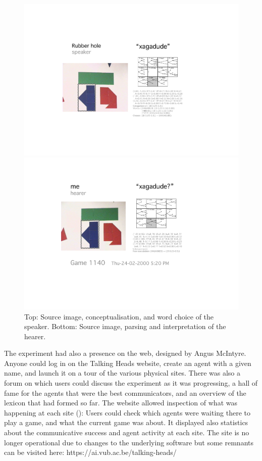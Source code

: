 \begin{figure}[htbp]
 \centerline{\includegraphics[width=.80\textwidth]{chap8/figures/xagadu-speaker}}
\centerline{\includegraphics[width=.80\textwidth]{chap8/figures/xagadu-hearer}}
\caption{\label{fig:interaction} 
Top: Source image, conceptualisation, and word choice of the speaker. Bottom: Source image, parsing and interpretation 
of the hearer.}
\end{figure}

The experiment had also a presence on the web, designed by Angus McIntyre. Anyone could log in on the 
Talking Heads website, create an agent with 
a given name, and launch it on a tour of the various physical sites. There was also a forum on which users could discuss
the experiment as it was progressing, a hall of fame for the agents that were the best communicators, and 
an overview of the lexicon 
that had formed so far. The website allowed inspection of what was happening at each site (): 
Users could check which agents were waiting there to play a game, and what the current 
game was about. It displayed also statistics about the 
communicative success and agent activity at each site. The site is no longer operational due to 
changes to the underlying software but some remnants can be visited here: https://ai.vub.ac.be/talking-heads/

